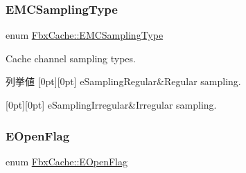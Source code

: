 \subsubsection{\texorpdfstring{E\+M\+C\+Sampling\+Type}{EMCSamplingType}}
{\footnotesize\ttfamily enum \hyperlink{class_fbx_cache_a9d4d8e73c5e2f510b7884ceaee13a173}{Fbx\+Cache\+::\+E\+M\+C\+Sampling\+Type}}



Cache channel sampling types. 

\begin{DoxyEnumFields}{列挙値}
[0pt][0pt]{}\mbox{\label{class_fbx_cache_a9d4d8e73c5e2f510b7884ceaee13a173ab7d871fa76cb0e28a77bfa48858637f2}} 
e\+Sampling\+Regular&Regular sampling. \\
\hline

[0pt][0pt]{}\mbox{\label{class_fbx_cache_a9d4d8e73c5e2f510b7884ceaee13a173afa23e18952e41deafe9237381018d023}} 
e\+Sampling\+Irregular&Irregular sampling. \\
\hline

\end{DoxyEnumFields}
\mbox{\label{class_fbx_cache_a92f455159736ec2cdc0c282af9dbd139}} 
\subsubsection{\texorpdfstring{E\+Open\+Flag}{EOpenFlag}}
{\footnotesize\ttfamily enum \hyperlink{class_fbx_cache_a92f455159736ec2cdc0c282af9dbd139}{Fbx\+Cache\+::\+E\+Open\+Flag}}

